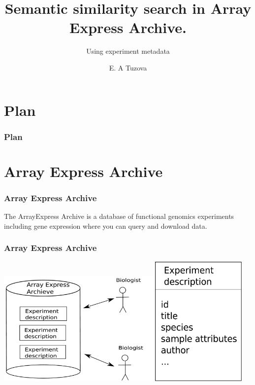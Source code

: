 \documentclass[utf8,handout]{beamer}
\title{Semantic similarity search in Array Express Archive.}
\subtitle{Using experiment metadata}
\author{E. A Tuzova}
\institute{European Bioinformatics institute}
\date{}
\begin{document}
\begin{frame}
  \titlepage
\end{frame}


\section*{Plan}
  \begin{frame}
    \frametitle{Plan}
    \tableofcontents[pausesections]

  \end{frame}

\section{Array Express Archive}
\begin{frame}
	\frametitle{Array Express Archive} 
The ArrayExpress Archive is a database of functional genomics experiments including gene expression where you can query and download data.
\end{frame}

\begin{frame}
	\frametitle{Array Express Archive} 
	\includegraphics[width=0.6\textwidth]{./arrayExpress}
	\includegraphics[width=0.35\textwidth]{./experimentDescription}	

\end{frame}
\end{document}
